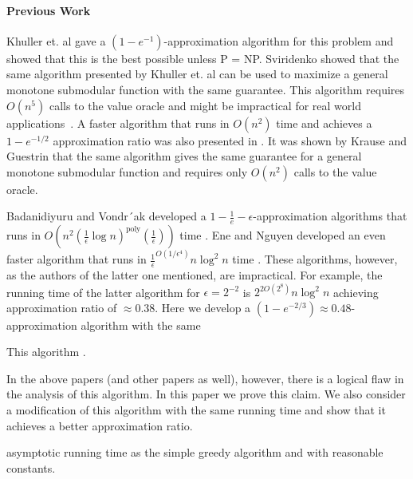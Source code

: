 \paragraph*{Previous Work}
Khuller et. al \cite{khuller1999budgeted}
gave a $(1-e^{-1})$-approximation algorithm for this problem and showed that this
is the best possible unless P = NP.
Sviridenko \cite{sviridenko2004note} showed that the same algorithm presented by
Khuller et. al can be used to maximize a general monotone submodular function
with the same guarantee.
This algorithm requires $O(n^5)$ calls to the value oracle and might be impractical for real world applications~\cite{lin2010multi}.
A faster algorithm that runs in $O(n^2)$ time and achieves a $1 - e^{-1/2}$ approximation ratio was also presented in \cite{khuller1999budgeted}.
It was shown by Krause and Guestrin \cite{krause2005note} that the same algorithm
gives the same guarantee for a general monotone submodular function and requires only $O(n^2)$ calls to the value oracle.

Badanidiyuru and Vondr´ak developed a $1 - \frac{1}{e} - \epsilon$-approximation 
algorithms that runs in 
$O(n^2(\frac{1}{\epsilon}\log n)^\text{poly}(\frac{1}{\epsilon}))$ time 
\cite{badanidiyuru2014fast}.
Ene and Nguyen developed an even faster algorithm that runs in 
$\frac{1}{\epsilon}^{O(1/\epsilon^4)}n \log^2 n$ time
\cite{Alina2017}.
These algorithms, however, 
as the authors of the latter one mentioned, are impractical.
For example, the running time of the latter algorithm for $\epsilon = 2^{-2}$ is
$2^{2O(2^{8})}n\log^2n$ achieving approximation ratio of $\approx 0.38$.
Here we develop a $(1 - e^{-2/3}) \approx 0.48$-approximation algorithm with the same

This algorithm .

In the above papers (and other papers as well), however,
there is a logical flaw in the analysis of this algorithm.
In this paper we prove this claim.
We also consider a modification of this algorithm with the same running time and show that it
achieves a better approximation ratio.

asymptotic running time as the simple greedy algorithm and with reasonable constants.

